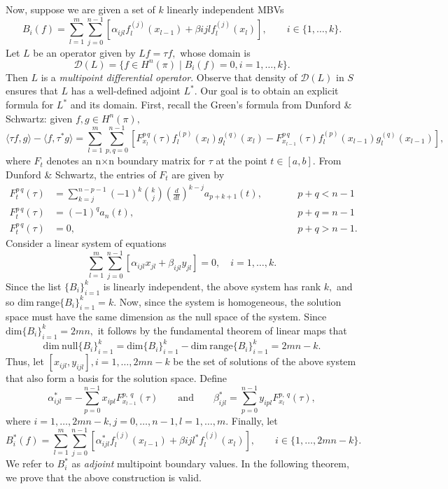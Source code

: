 \documentclass[11pt,reqno,oneside,a4paper]{article}
\begin{document}
Now, suppose we are given a set of $k$ linearly independent MBVs 
\[ 
B_i(f) = \sum^{m}_{l=1} \sum^{n-1}_{j=0}[\alpha_{ijl} f_l^{(j)}(x_{l-1}) + \beta{ijl} f_l^{(j)}(x_{l})], \qquad i \in \{ 1, \ldots, k \}.
\]
Let $L$ be an operator given by $Lf = \tau f,$ whose domain is 
\[ 
\mathcal{D}(L) = \{ f \in H^n(\pi) \mid B_i(f) = 0,  i = 1, \ldots, k \}.
\]
Then $L$ is a \emph{multipoint differential operator}. Observe that density of $\mathcal{D}(L)$ in $S$ ensures that $L$ has a well-defined adjoint $L^{*}.$ Our goal is to obtain an explicit formula for $L^{*}$ and its domain. First, recall the Green's formula from Dunford \& Schwartz: given $f,g \in H^n(\pi),$
\[ 
\langle \tau f,g\rangle - \langle f, \tau^*g\rangle = \sum_{l=1}^{m}\sum_{p,q=0}^{n-1}[F_{x_l}^{p\,q}(\tau) f_l^{(p)}(x_l)g_l^{(q)}(x_l) - F_{x_{l-1}}^{p\,q}(\tau) f_l^{(p)}(x_{l-1})g_l^{(q)}(x_{l-1})],
\]
where $F_t$ denotes an n$\times$n boundary matrix for $\tau$ at the point $t \in [a,b].$ From Dunford \& Schwartz, the entries of $F_t$ are given by
\begin{equation*}
\begin{aligned}
F_{t}^{p\,q}(\tau) &= \sum^{n-p-1}_{k = j} (-1)^k \binom{k}{j} \left( \frac{d}{dt}\right)^{k-j} a_{p+k+1}(t), &&\qquad p + q< n - 1\\
F_{t}^{p\,q}(\tau) &= (-1)^q  a_{n}(t), &&\qquad p + q= n - 1\\
F_{t}^{p\,q}(\tau) &= 0, &&\qquad p + q > n - 1.
\end{aligned}
\end{equation*}
Consider a linear system of equations 
\[ \sum_{l=1}^{m}\sum_{j=0}^{n-1}[\alpha_{ijl}x_{jl} + \beta_{ijl}y_{jl}]=0 ,\quad i = 1,\dots,k. \]
Since the list $\{ B_i\}_{i=1}^k$ is linearly independent, the above system has rank $k,$ and so $\mathrm{dim}~\mathrm{range}\{ B_i\}_{i=1}^k = k.$ Now, since the system is homogeneous, the solution space must have the same dimension as the null space of the system. Since $\mathrm{dim} \{ B_i\}_{i=1}^k =2mn,$ it follows by the fundamental theorem of linear maps that 
\[ 
\mathrm{dim}~ \mathrm{null}\{ B_i\}_{i=1}^k = \mathrm{dim} \{ B_i\}_{i=1}^k - \mathrm{dim}~\mathrm{range}\{ B_i\}_{i=1}^k = 2mn - k.
\] 
Thus, let  $[x_{ijl},y_{ijl}], i=1,\dots,2mn-k$ be the set of solutions of the above system that also form a basis for the solution space. Define
\[ 
\alpha^{*}_{ijl} = - \sum^{n-1}_{p=0} x_{ipl} F_{x_{l-1}}^{p,\ q}(\tau) \qquad \mbox{and} \qquad \beta^{*}_{ijl} = \sum^{n-1}_{p=0} y_{ipl} F_{x_{l}}^{p,\ q}(\tau),
\]
where $i = 1, \ldots, 2mn-k, j = 0, \ldots, n-1, l = 1, \ldots, m.$ Finally, let 
\[ 
B_i^{*}(f) = \sum^{m}_{l=1} \sum^{n-1}_{j=0}[\alpha_{ijl}^{*} f_l^{(j)}(x_{l-1}) + \beta{ijl}^{*} f_l^{(j)}(x_{l})], \qquad i \in \{ 1, \ldots, 2mn-k \}.
\]
We refer to $B^{*}_i$ as \emph{adjoint} multipoint boundary values. In the following theorem, we prove that the above construction is valid.
\end{document}
